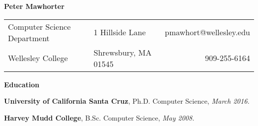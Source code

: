 \documentclass[11pt]{article}
\newenvironment{sct}[1]{%
  \vspace{8pt plus 2pt minus 4pt}\textbf{\Large #1} \hrulefill\vspace{6pt}
  \begin{adjustwidth}{6pt}{0pt}
}{%
  \end{adjustwidth}
}
\newcommand{\edu}[3]{\textbf{#1}, #2, \textit{#3.}}
\begin{document}
\textbf{\huge Peter Mawhorter }\hrulefill\vspace{6pt}

\begin{tabularx}{\textwidth}{X X r}
Computer Science Department & 1 Hillside Lane & pmawhort@wellesley.edu \\
Wellesley College & Shrewsbury, MA 01545 & 909-255-6164 \\
\end{tabularx}

\begin{sct}{Education}

\edu{University of California Santa Cruz}{Ph.D. Computer Science}{March 2016}

\edu{Harvey Mudd College}{B.Sc. Computer Science}{May 2008}

\end{sct}
\end{document}
